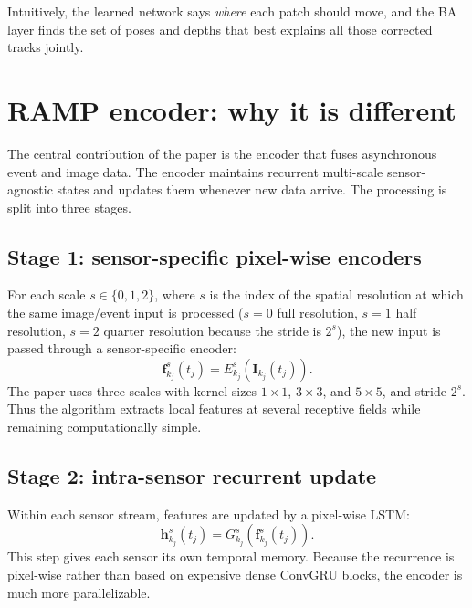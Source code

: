 \documentclass[11pt]{article}
\begin{document}
Intuitively, the learned network says \emph{where} each patch should move, and the BA layer finds the set of poses and depths that best explains all those corrected tracks jointly.

\section{RAMP encoder: why it is different}

The central contribution of the paper is the encoder that fuses asynchronous event and image data.
The encoder maintains recurrent multi-scale sensor-agnostic states and updates them whenever new data arrive.
The processing is split into three stages.

\subsection{Stage 1: sensor-specific pixel-wise encoders}
For each scale \(s\in\{0,1,2\}\), where \(s\) is the index of the spatial resolution at which the same image/event input is processed (\(s=0\) full resolution, \(s=1\) half resolution, \(s=2\) quarter resolution because the stride is \(2^s\)), the new input is passed through a sensor-specific encoder:
\begin{equation}
\mathbf{f}_{k_j}^{s}(t_j) = E_{k_j}^{s}(\mathbf{I}_{k_j}(t_j)).
\end{equation}
The paper uses three scales with kernel sizes \(1\times 1\), \(3\times 3\), and \(5\times 5\), and stride \(2^s\).
Thus the algorithm extracts local features at several receptive fields while remaining computationally simple.

\subsection{Stage 2: intra-sensor recurrent update}
Within each sensor stream, features are updated by a pixel-wise LSTM:
\begin{equation}
\mathbf{h}_{k_j}^{s}(t_j) = G_{k_j}^{s}(\mathbf{f}_{k_j}^{s}(t_j)).
\end{equation}
This step gives each sensor its own temporal memory.
Because the recurrence is pixel-wise rather than based on expensive dense ConvGRU blocks, the encoder is much more parallelizable.
\end{document}
